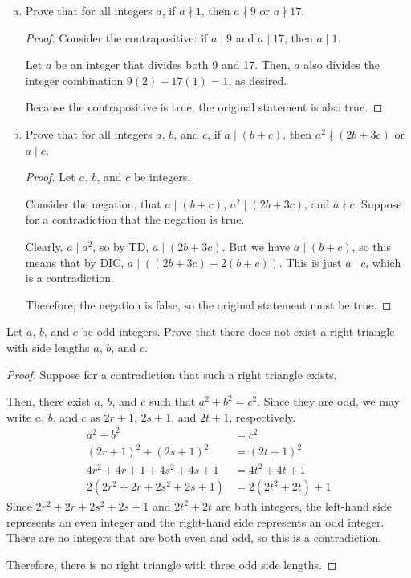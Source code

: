 \question \begin{enumerate}[(a)]
  \item Prove that for all integers $a$, if $a \nmid 1$, then $a \nmid 9$ or $a \nmid 17$.
        \begin{proof}
          Consider the contrapositive: if $a \mid 9$ and $a \mid 17$, then $a \mid 1$.

          Let $a$ be an integer that divides both 9 and 17.
          Then, $a$ also divides the integer combination $9(2) - 17(1) = 1$, as desired.

          Because the contrapositive is true, the original statement is also true.
        \end{proof}
  \item Prove that for all integers $a$, $b$, and $c$, if $a \mid (b + c)$,
        then $a^2 \nmid (2b + 3c)$ or $a\mid c$.
        \begin{proof}
          Let $a$, $b$, and $c$ be integers.

          Consider the negation, that $a \mid (b+c)$, $a^2 \mid (2b+3c)$, and $a \nmid c$.
          Suppose for a contradiction that the negation is true.

          Clearly, $a \mid a^2$, so by TD, $a \mid (2b+3c)$.
          But we have $a \mid (b+c)$, so this means that by DIC, $a \mid ((2b+3c)-2(b+c))$.
          This is just $a \mid c$, which is a contradiction.

          Therefore, the negation is false, so the original statement must be true.
        \end{proof}
\end{enumerate}


\question Let $a$, $b$, and $c$ be odd integers.
Prove that there does not exist a right triangle with side lengths $a$, $b$, and $c$.
\begin{proof}
  Suppose for a contradiction that such a right triangle exists.

  Then, there exist $a$, $b$, and $c$ such that $a^2+b^2=c^2$.
  Since they are odd, we may write $a$, $b$, and $c$ as $2r+1$, $2s+1$, and $2t+1$, respectively.
  \begin{align*}
    a^2 + b^2                     & = c^2              \\
    (2r+1)^2 + (2s+1)^2           & = (2t+1)^2         \\
    4r^2 + 4r + 1 + 4s^2 + 4s + 1 & = 4t^2 + 4t + 1    \\
    2(2r^2 + 2r + 2s^2 + 2s + 1)  & = 2(2t^2 + 2t) + 1
  \end{align*}
  Since $2r^2 + 2r + 2s^2 + 2s + 1$ and $2t^2 + 2t$ are both integers,
  the left-hand side represents an even integer and the right-hand side represents an odd integer.
  There are no integers that are both even and odd, so this is a contradiction.

  Therefore, there is no right triangle with three odd side lengths.
\end{proof}


